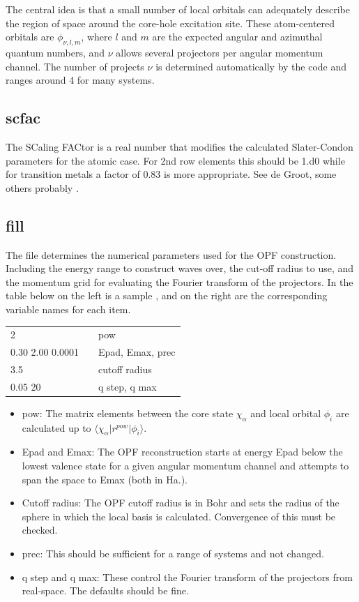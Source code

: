 \documentclass[11pt]{report}
\begin{document}
The central idea is that a small number of local orbitals can adequately describe the region of space around the 
core-hole excitation site. These atom-centered orbitals are $\phi_{\nu,l,m}$, where $l$ and $m$ are the 
expected angular and azimuthal quantum numbers, and $\nu$ allows several projectors per angular momentum channel. 
The number of projects $\nu$ is determined automatically by the code and ranges around 4 for many systems. 

\subsection{scfac}
The SCaling FACtor is a real number that modifies the calculated Slater-Condon parameters for the atomic case. For 2nd row elements this should be 1.d0 while for transition metals a factor of 0.83 is more appropriate. See de Groot, some others probably \cite{degroot.book}.

\subsection{fill}
\label{fill}
The  file determines the numerical parameters used for the OPF construction. Including the energy range to construct waves over,
the cut-off radius to use, and the momentum grid for evaluating the Fourier transform of the projectors. 
In the table below on the left is a sample , and on the right are the corresponding variable names for each item.

\begin{center}
\begin{tabular}{| l | c l |}
\hline
2						& &  pow \\
0.30 2.00 0.0001		& & Epad, Emax, prec \\
3.5 					& & cutoff radius \\
0.05 20					& & q step, q max \\
\hline
\end{tabular}
\end{center}

\begin{itemize}
\item pow: The matrix elements between the core state $\chi_\alpha$ and local orbital $\phi_i$ are calculated
 up to $\langle \chi_\alpha \vert r^{pow} \vert \phi_i \rangle$. 
\item Epad and Emax: The OPF reconstruction starts at energy Epad below the lowest valence state for a given angular momentum channel and attempts to span the space to Emax (both in Ha.). 
\item Cutoff radius: The OPF cutoff radius is in Bohr and sets the radius of the sphere in which the local basis is calculated. Convergence of this must be checked. 
\item prec: This should be sufficient for a range of systems and not changed.
\item q step and q max: These control the Fourier transform of the projectors from real-space. The defaults should be fine.
\end{itemize}
\end{document}
